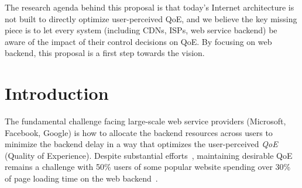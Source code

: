 The research agenda behind this proposal is that today's Internet architecture is not built to directly optimize user-perceived QoE, and we believe the key missing piece is to let every system (including CDNs, ISPs, web service backend) be aware of the impact of their control decisions on QoE. By focusing on web backend, this proposal is a first step towards the vision. 




\section{Introduction}

\noindent 
The fundamental challenge facing large-scale web service providers (\eg Microsoft, Facebook, Google) is how to allocate the backend resources across users to minimize the backend delay in a way that optimizes the user-perceived {\em QoE} (Quality of Experience). 
Despite substantial efforts~\cite{??,??,??}, maintaining desirable QoE remains a challenge with 50\% users of some popular website spending over 30\% of page loading time on the web backend~\cite{mystery}.


